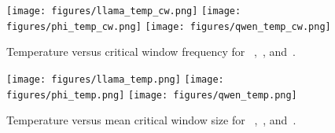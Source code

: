 \begin{figure}[H] 
    \centering
    \texttt{[image: figures/llama\_temp\_cw.png]}
    \texttt{[image: figures/phi\_temp\_cw.png]}
    \texttt{[image: figures/qwen\_temp\_cw.png]}
    \caption{Temperature versus critical window frequency for ~\llamainstruct,~\phiinstruct, and~\qweninstruct.}
    \label{fig:app:temp_cw}
\end{figure}



\begin{figure}[H] 
    \centering
    \texttt{[image: figures/llama\_temp.png]}
    \texttt{[image: figures/phi\_temp.png]}
    \texttt{[image: figures/qwen\_temp.png]}
    \caption{Temperature versus mean critical window size for ~\llamainstruct,~\phiinstruct, and~\qweninstruct.}
    \label{fig:app:temp}
\end{figure}
 